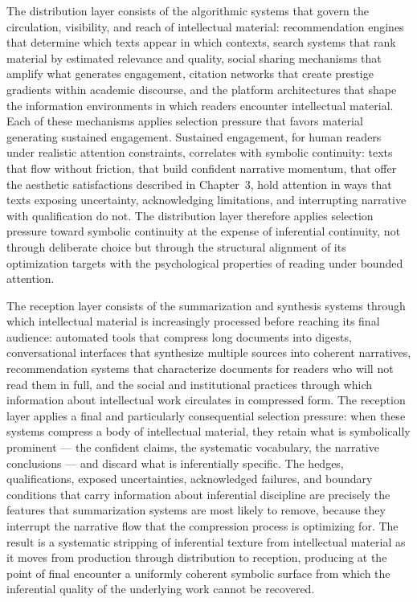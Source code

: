 \documentclass[12pt, openright, twoside]{book}
\begin{document}
The distribution layer consists of the algorithmic systems that
govern the circulation, visibility, and reach of intellectual
material: recommendation engines that determine which texts appear
in which contexts, search systems that rank material by estimated
relevance and quality, social sharing mechanisms that amplify what
generates engagement, citation networks that create prestige gradients
within academic discourse, and the platform architectures that
shape the information environments in which readers encounter
intellectual material. Each of these mechanisms applies selection
pressure that favors material generating sustained engagement.
Sustained engagement, for human readers under realistic attention
constraints, correlates with symbolic continuity: texts that flow
without friction, that build confident narrative momentum, that
offer the aesthetic satisfactions described in Chapter~3, hold
attention in ways that texts exposing uncertainty, acknowledging
limitations, and interrupting narrative with qualification do not.
The distribution layer therefore applies selection pressure toward
symbolic continuity at the expense of inferential continuity, not
through deliberate choice but through the structural alignment of
its optimization targets with the psychological properties of reading
under bounded attention.

The reception layer consists of the summarization and synthesis
systems through which intellectual material is increasingly
processed before reaching its final audience: automated tools that
compress long documents into digests, conversational interfaces
that synthesize multiple sources into coherent narratives,
recommendation systems that characterize documents for readers
who will not read them in full, and the social and institutional
practices through which information about intellectual work circulates
in compressed form. The reception layer applies a final and
particularly consequential selection pressure: when these systems
compress a body of intellectual material, they retain what is
symbolically prominent --- the confident claims, the systematic
vocabulary, the narrative conclusions --- and discard what is
inferentially specific. The hedges, qualifications, exposed
uncertainties, acknowledged failures, and boundary conditions
that carry information about inferential discipline are precisely
the features that summarization systems are most likely to remove,
because they interrupt the narrative flow that the compression
process is optimizing for. The result is a systematic stripping
of inferential texture from intellectual material as it moves
from production through distribution to reception, producing at
the point of final encounter a uniformly coherent symbolic surface
from which the inferential quality of the underlying work cannot
be recovered.
\end{document}
